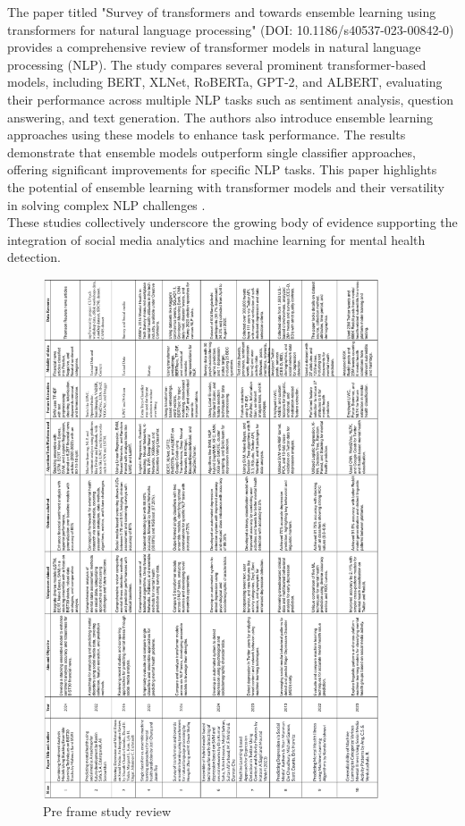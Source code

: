 \noindent
The paper titled "Survey of transformers and towards ensemble learning using transformers for natural language processing" (DOI: 10.1186/s40537-023-00842-0) provides a comprehensive review of transformer models in natural language processing (NLP). The study compares several prominent transformer-based models, including BERT, XLNet, RoBERTa, GPT-2, and ALBERT, evaluating their performance across multiple NLP tasks such as sentiment analysis, question answering, and text generation. The authors also introduce ensemble learning approaches using these models to enhance task performance. The results demonstrate that ensemble models outperform single classifier approaches, offering significant improvements for specific NLP tasks. This paper highlights the potential of ensemble learning with transformer models and their versatility in solving complex NLP challenges \cite{Zhang_2024}. \\

\noindent
These studies collectively underscore the growing body of evidence supporting the integration of social media analytics and machine learning for mental health detection.



\begin{figure}[h!]  
    \centering
    \includegraphics[width=0.89\textwidth]{Images/preframe-study.png}  
    \caption{Pre frame study review}
    \label{Preframe Study Review}  %
\end{figure}


\pagebreak
